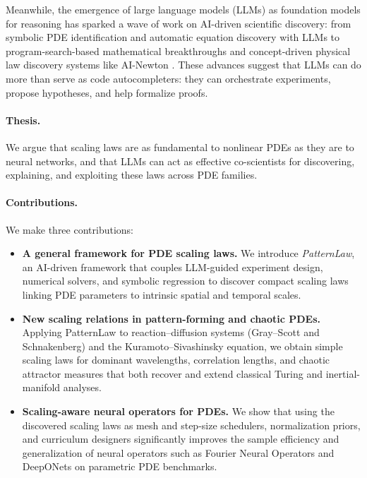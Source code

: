 \documentclass{article}
\theoremstyle{plain}
\theoremstyle{definition}
\theoremstyle{remark}
\begin{document}
Meanwhile, the emergence of large language models (LLMs) as foundation models for reasoning has sparked a wave of work on AI-driven scientific discovery: from symbolic PDE identification \citep{Rudy2017PDEDiscovery} and automatic equation discovery with LLMs \citep{Du2024LLMEquationDiscovery,Luo2025LLMPDEDiscovery,Ivanchik2025LLMDream,Bhatnagar2025SymbolicPDELLM} to program-search-based mathematical breakthroughs \citep{RomeraParedes2024FunSearch} and concept-driven physical law discovery systems like AI-Newton \citep{Fang2025AINewton}. These advances suggest that LLMs can do more than serve as code autocompleters: they can orchestrate experiments, propose hypotheses, and help formalize proofs.

\paragraph{Thesis.}
We argue that scaling laws are as fundamental to nonlinear PDEs as they are to neural networks, and that LLMs can act as effective co-scientists for discovering, explaining, and exploiting these laws across PDE families.

\paragraph{Contributions.}
We make three contributions:
\begin{itemize}
    \item \textbf{A general framework for PDE scaling laws.} We introduce \emph{PatternLaw}, an AI-driven framework that couples LLM-guided experiment design, numerical solvers, and symbolic regression to discover compact scaling laws linking PDE parameters to intrinsic spatial and temporal scales.
    \item \textbf{New scaling relations in pattern-forming and chaotic PDEs.} Applying PatternLaw to reaction--diffusion systems (Gray--Scott and Schnakenberg) and the Kuramoto--Sivashinsky equation, we obtain simple scaling laws for dominant wavelengths, correlation lengths, and chaotic attractor measures that both recover and extend classical Turing and inertial-manifold analyses.

        \item \textbf{Scaling-aware neural operators for PDEs.} We show that using the discovered scaling laws as mesh and step-size schedulers, normalization priors, and curriculum designers significantly improves the sample efficiency and generalization of neural operators such as Fourier Neural Operators and DeepONets on parametric PDE benchmarks.


\end{itemize}
\end{document}
